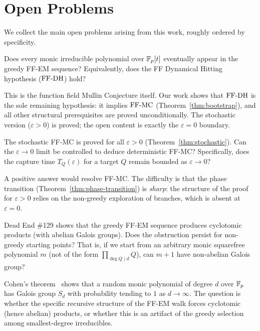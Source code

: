 \section{Open Problems}\label{sec:open}

We collect the main open problems arising from this work, roughly ordered
by specificity.

\begin{openproblem}[Deterministic FF-MC]
Does every monic irreducible polynomial over $\mathbb{F}_p[t]$ eventually appear in
the greedy FF-EM sequence? Equivalently, does the FF Dynamical Hitting
hypothesis ($\mathrm{FF\text{-}DH}$) hold?
\end{openproblem}

This is the function field Mullin Conjecture itself. Our work shows that
$\mathrm{FF\text{-}DH}$ is the sole remaining hypothesis: it implies $\mathrm{FF\text{-}MC}$
(Theorem~\ref{thm:bootstrap}), and all other structural prerequisites are
proved unconditionally. The stochastic version ($\varepsilon > 0$) is
proved; the open content is exactly the $\varepsilon = 0$ boundary.

\begin{openproblem}
The stochastic FF-MC is proved for all $\varepsilon > 0$
(Theorem~\ref{thm:stochastic}). Can the $\varepsilon \to 0$ limit be
controlled to deduce deterministic FF-MC? Specifically, does the capture
time $T_Q(\varepsilon)$ for a target $Q$ remain bounded as
$\varepsilon \to 0$?
\end{openproblem}

A positive answer would resolve FF-MC. The difficulty is that the phase
transition (Theorem~\ref{thm:phase-transition}) is \emph{sharp}: the
structure of the proof for $\varepsilon > 0$ relies on the non-greedy
exploration of branches, which is absent at $\varepsilon = 0$.

\begin{openproblem}
Dead End \#129 shows that the greedy FF-EM sequence produces cyclotomic
products (with abelian Galois groups). Does the obstruction persist for
non-greedy starting points? That is, if we start from an arbitrary monic
squarefree polynomial $m$ (not of the form
$\prod_{\deg Q \mid d} Q$), can $m + 1$ have non-abelian Galois group?
\end{openproblem}

Cohen's theorem~\cite{Cohen70} shows that a random monic polynomial of
degree $d$ over $\mathbb{F}_p$ has Galois group $S_d$ with probability tending to
$1$ as $d \to \infty$. The question is whether the specific recursive
structure of the FF-EM walk forces cyclotomic (hence abelian) products,
or whether this is an artifact of the greedy selection among
smallest-degree irreducibles.

